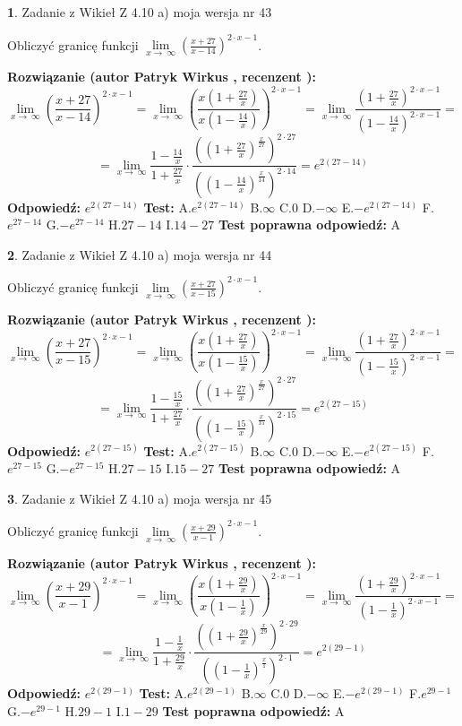 \documentclass[12pt, a4paper]{article}
\theoremstyle{definition} %
\newtheorem{zad}{}
\newcommand{\zadStart}[1]{\begin{zad}#1\newline}
\newcommand{\zadStop}{\end{zad}}
\newcommand{\rozwStart}[2]{\noindent \textbf{Rozwiązanie (autor #1 , recenzent #2): }\newline}
\newcommand{\rozwStop}{\newline}
\newcommand{\odpStart}{\noindent \textbf{Odpowiedź:}\newline}
\newcommand{\odpStop}{\newline}
\newcommand{\testStart}{\noindent \textbf{Test:}\newline}
\newcommand{\testStop}{\newline}
\newcommand{\kluczStart}{\noindent \textbf{Test poprawna odpowiedź:}\newline}
\newcommand{\kluczStop}{\newline}
\begin{document}
\zadStart{Zadanie z Wikieł Z 4.10 a) moja wersja nr 43}


Obliczyć granicę funkcji  $\lim\limits_{x\to\ \infty}(\frac{x+27}{x-14})^{2\cdot x-1}$.
\zadStop
\rozwStart{Patryk Wirkus}{}
$$\lim\limits_{x\to\ \infty}(\frac{x+27}{x-14})^{2\cdot x-1} = \lim\limits_{x\to\ \infty}(\frac{x(1+\frac{27}{x})}{x(1-\frac{14}{x})})^{2\cdot x-1}=\lim\limits_{x\to\ \infty}\frac{(1+\frac{27}{x})^{2\cdot x-1}}{(1-\frac{14}{x})^{2\cdot x-1}}=$$
$$=\lim\limits_{x\to\ \infty}\frac{1-\frac{14}{x}}{1+\frac{27}{x}}\cdot\frac{((1+\frac{27}{x})^{\frac{x}{27}})^{2\cdot27}}{((1-\frac{14}{x})^{\frac{x}{14}})^{2\cdot14}}=e^{2(27-14)}$$
\rozwStop
\odpStart
$e^{2(27-14)}$
\odpStop
\testStart
A.$e^{2(27-14)}$ B.$\infty$ C.$0$ D.$-\infty$ E.$-e^{2(27-14)}$
F.$e^{27-14}$ G.$-e^{27-14}$
H.$27-14$
I.$14-27$
\testStop
\kluczStart
A
\kluczStop



\zadStart{Zadanie z Wikieł Z 4.10 a) moja wersja nr 44}


Obliczyć granicę funkcji  $\lim\limits_{x\to\ \infty}(\frac{x+27}{x-15})^{2\cdot x-1}$.
\zadStop
\rozwStart{Patryk Wirkus}{}
$$\lim\limits_{x\to\ \infty}(\frac{x+27}{x-15})^{2\cdot x-1} = \lim\limits_{x\to\ \infty}(\frac{x(1+\frac{27}{x})}{x(1-\frac{15}{x})})^{2\cdot x-1}=\lim\limits_{x\to\ \infty}\frac{(1+\frac{27}{x})^{2\cdot x-1}}{(1-\frac{15}{x})^{2\cdot x-1}}=$$
$$=\lim\limits_{x\to\ \infty}\frac{1-\frac{15}{x}}{1+\frac{27}{x}}\cdot\frac{((1+\frac{27}{x})^{\frac{x}{27}})^{2\cdot27}}{((1-\frac{15}{x})^{\frac{x}{15}})^{2\cdot15}}=e^{2(27-15)}$$
\rozwStop
\odpStart
$e^{2(27-15)}$
\odpStop
\testStart
A.$e^{2(27-15)}$ B.$\infty$ C.$0$ D.$-\infty$ E.$-e^{2(27-15)}$
F.$e^{27-15}$ G.$-e^{27-15}$
H.$27-15$
I.$15-27$
\testStop
\kluczStart
A
\kluczStop



\zadStart{Zadanie z Wikieł Z 4.10 a) moja wersja nr 45}


Obliczyć granicę funkcji  $\lim\limits_{x\to\ \infty}(\frac{x+29}{x-1})^{2\cdot x-1}$.
\zadStop
\rozwStart{Patryk Wirkus}{}
$$\lim\limits_{x\to\ \infty}(\frac{x+29}{x-1})^{2\cdot x-1} = \lim\limits_{x\to\ \infty}(\frac{x(1+\frac{29}{x})}{x(1-\frac{1}{x})})^{2\cdot x-1}=\lim\limits_{x\to\ \infty}\frac{(1+\frac{29}{x})^{2\cdot x-1}}{(1-\frac{1}{x})^{2\cdot x-1}}=$$
$$=\lim\limits_{x\to\ \infty}\frac{1-\frac{1}{x}}{1+\frac{29}{x}}\cdot\frac{((1+\frac{29}{x})^{\frac{x}{29}})^{2\cdot29}}{((1-\frac{1}{x})^{\frac{x}{1}})^{2\cdot1}}=e^{2(29-1)}$$
\rozwStop
\odpStart
$e^{2(29-1)}$
\odpStop
\testStart
A.$e^{2(29-1)}$ B.$\infty$ C.$0$ D.$-\infty$ E.$-e^{2(29-1)}$
F.$e^{29-1}$ G.$-e^{29-1}$
H.$29-1$
I.$1-29$
\testStop
\kluczStart
A
\kluczStop
\end{document}
